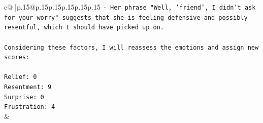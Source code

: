\documentclass{article}
\begin{document}
{\begin{supertabular}{c@{$\;$}|p{.15\linewidth}@{}p{.15\linewidth}p{.15\linewidth}p{.15\linewidth}p{.15\linewidth}p{.15\linewidth}}
{{{\texttt{{-} Her phrase "Well, 'friend', I didn't ask for your worry" suggests that she is feeling defensive and possibly resentful, which I should have picked up on.} \\
\\ 
\texttt{Considering these factors, I will reassess the emotions and assign new scores:} \\
\\ 
\texttt{Relief: 0} \\
\texttt{Resentment: 9} \\
\texttt{Surprise: 0} \\
\texttt{Frustration: 4} \\
            }
        }
    }
    & \\ \\

\end{supertabular}
}
\end{document}
